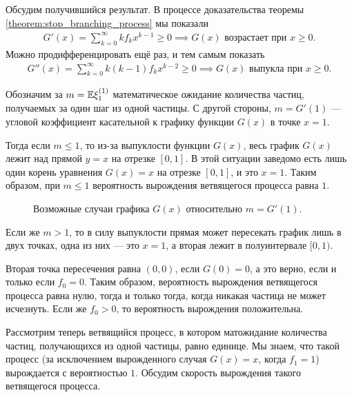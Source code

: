 \documentclass[../main.tex]{subfiles}
\begin{document}
\begin{remrk*}
 
Обсудим получившийся результат. В процессе доказательства теоремы \ref{theorem:stop_branching_process} мы показали
\begin{align*}
 G'(x) = \sum_{k=0}^{\infty} k f_k x^{k-1} \geqslant 0 \implies G(x) \text{ возрастает при } x \geqslant 0.
\end{align*} Можно продифференцировать ещё раз, и тем самым показать
\begin{align*}
 G''(x) = \sum_{k=0}^{\infty} k (k-1) f_k x^{k-2} \geqslant 0 \implies G(x) \text{ выпукла при } x \geqslant 0.
\end{align*}

Обозначим за $ m = \mathbb E \xi_1^{(1)} $ математическое ожидание количества частиц, получаемых за один шаг из одной частицы. С другой стороны, $ m = G'(1) $ --- угловой коэффициент касательной к графику функции $ G(x) $ в точке $ x = 1 $.

Тогда если $ m \leqslant 1 $, то из-за выпуклости функции $ G(x) $, весь график $ G(x) $ лежит над прямой $ y = x $ на отрезке $ [0,1] $. В этой ситуации заведомо есть лишь один корень уравнения $ G(x) = x $ на отрезке $ [0,1] $, и это $ x = 1 $. Таким образом, при $ m \leqslant 1 $ вероятность вырождения ветвящегося процесса равна $ 1 $.

\begin{figure}[ht]
 \centering
 \caption{Возможные случаи графика $ G(x) $ относительно $ m=G'(1) $.}
 \label{fig:g_convex}
\end{figure}

Если же $ m > 1 $, то в силу выпуклости прямая может пересекать график лишь в двух точках, одна из них --- это $ x = 1 $, а вторая лежит в полуинтервале $ [0,1) $. 

Вторая точка пересечения равна $ (0,0) $, если $ G(0) = 0 $, а это верно, если и только если $ f_0 = 0 $. Таким образом, вероятность вырождения ветвящегося процесса равна нулю, тогда и только тогда, когда никакая частица не может исчезнуть. Если же $ f_0 > 0 $, то вероятность вырождения положительна.

\end{remrk*}

Рассмотрим теперь ветвящийся процесс, в котором матожидание количества частиц, получающихся из одной частицы, равно единице. Мы знаем, что такой процесс (за исключением вырожденного случая $ G(x) = x $, когда $ f_1 = 1 $) вырождается с вероятностью $ 1 $. Обсудим скорость вырождения такого ветвящегося процесса.
\end{document}
